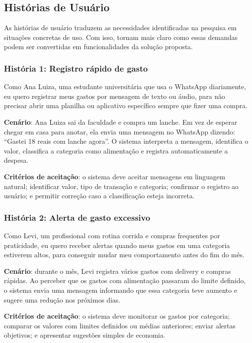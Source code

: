 \subsection{Histórias de Usuário}

As histórias de usuário traduzem as necessidades identificadas na pesquisa em situações concretas de uso. Com isso, tornam mais claro como essas demandas podem ser convertidas em funcionalidades da solução proposta.

\subsubsection{História 1: Registro rápido de gasto}

Como Ana Luiza, uma estudante universitária que usa o WhatsApp diariamente, eu quero registrar meus gastos por mensagem de texto ou áudio, para não precisar abrir uma planilha ou aplicativo específico sempre que fizer uma compra.

\textbf{Cenário}: Ana Luiza sai da faculdade e compra um lanche. Em vez de esperar chegar em casa para anotar, ela envia uma mensagem no WhatsApp dizendo: ``Gastei 18 reais com lanche agora''. O sistema interpreta a mensagem, identifica o valor, classifica a categoria como alimentação e registra automaticamente a despesa.

\textbf{Critérios de aceitação}: o sistema deve aceitar mensagens em linguagem natural; identificar valor, tipo de transação e categoria; confirmar o registro ao usuário; e permitir correção caso a classificação esteja incorreta.

\subsubsection{História 2: Alerta de gasto excessivo}

Como Levi, um profissional com rotina corrida e compras frequentes por praticidade, eu quero receber alertas quando meus gastos em uma categoria estiverem altos, para conseguir mudar meu comportamento antes do fim do mês.

\textbf{Cenário}: durante o mês, Levi registra vários gastos com delivery e compras rápidas. Ao perceber que os gastos com alimentação passaram do limite definido, o sistema envia uma mensagem informando que essa categoria teve aumento e sugere uma redução nos próximos dias.

\textbf{Critérios de aceitação}: o sistema deve monitorar os gastos por categoria; comparar os valores com limites definidos ou médias anteriores; enviar alertas objetivos; e apresentar sugestões simples de economia.

